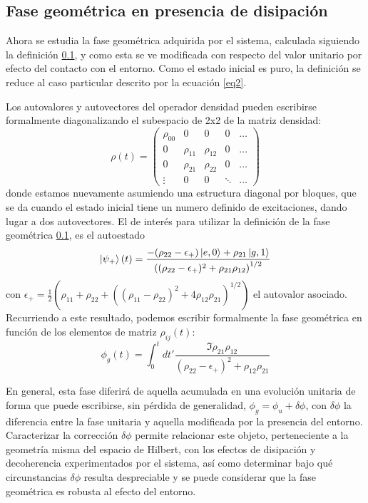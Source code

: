 \subsection{Fase geométrica en presencia de disipación}
Ahora se estudia la fase geométrica adquirida por el sistema, calculada siguiendo la definición \ref{}, y como esta se ve modificada con respecto del valor unitario por efecto del contacto con el entorno. Como el estado inicial es puro, la definición se reduce al caso particular descrito por la ecuación \ref{eq2}.

Los autovalores y autovectores del operador densidad pueden escribirse formalmente  diagonalizando el subespacio de 2x2 de la matriz densidad:
\begin{equation}
    \rho(t)=\begin{pmatrix}
        \rho_{00} & 0 & 0 & 0 &\dots \\
        0 & \rho_{11} & \rho_{12} & 0 & \dots \\
        0 & \rho_{21} & \rho_{22} & 0 & \dots \\ 
        \vdots & 0 & 0 & \ddots & \dots 
    \end{pmatrix}
\end{equation}
donde estamos nuevamente asumiendo una estructura diagonal por bloques, que se da cuando el estado inicial tiene un numero definido de excitaciones, dando lugar a dos autovectores. El de interés para utilizar la definición de la fase geométrica \ref{}, es el autoestado
\begin{equation}
    \ket{\psi_+}(t)=\frac{-(\rho_{22}-\epsilon_+)\ket{e,0}+\rho_{21}\ket{g,1}}{\left((\rho_{22}-\epsilon_+)^2+\rho_{21}\rho_{12} \right)^{1/2}}
\end{equation}
con $\epsilon_+=\frac{1}{2}(\rho_{11}+\rho_{22}+((\rho_{11}-\rho_{22})^2+4\rho_{12}\rho_{21})^{1/2})$ el autovalor asociado. Recurriendo a este resultado, podemos escribir formalmente la fase geométrica en función de los elementos de matriz $\rho_{ij}(t)$:
\begin{equation}
    \phi_g(t)=\int_0^t dt' \frac{\Im \dot\rho_{21}\rho_{12}}{(\rho_{22}-\epsilon_+)^2+\rho_{12}\rho_{21}}
\end{equation}

En general, esta fase diferirá de aquella acumulada en una evolución unitaria de forma que puede
escribirse, sin pérdida de generalidad, $\phi_g=\phi_u+\delta\phi$, con $\delta\phi$ la diferencia entre la fase unitaria y
aquella modificada por la presencia del entorno. Caracterizar la corrección $\delta\phi$ permite relacionar este
objeto, perteneciente a la geometría misma del espacio de Hilbert, con los efectos de disipación y
decoherencia experimentados por el sistema, así como determinar bajo qué circunstancias $\delta\phi$ resulta
despreciable y se puede considerar que la fase geométrica es robusta al efecto del entorno.

